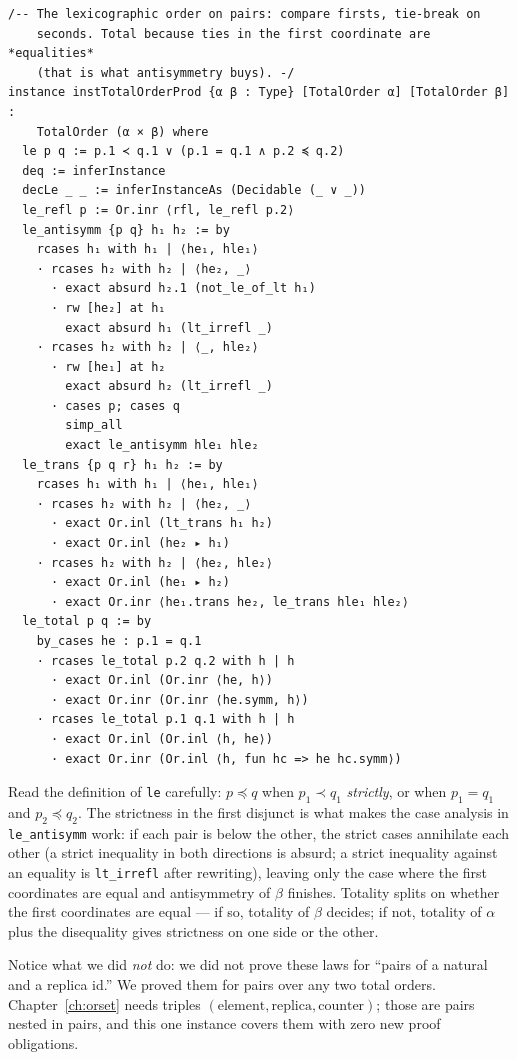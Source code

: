 \documentclass[12pt, a4paper, openright]{book}
\theoremstyle{thmstyle}
\theoremstyle{defstyle}
\newcommand{\lc}[1]{\texttt{#1}}
\begin{document}
\begin{verbatim}
/-- The lexicographic order on pairs: compare firsts, tie-break on
    seconds. Total because ties in the first coordinate are *equalities*
    (that is what antisymmetry buys). -/
instance instTotalOrderProd {α β : Type} [TotalOrder α] [TotalOrder β] :
    TotalOrder (α × β) where
  le p q := p.1 ≺ q.1 ∨ (p.1 = q.1 ∧ p.2 ≼ q.2)
  deq := inferInstance
  decLe _ _ := inferInstanceAs (Decidable (_ ∨ _))
  le_refl p := Or.inr ⟨rfl, le_refl p.2⟩
  le_antisymm {p q} h₁ h₂ := by
    rcases h₁ with h₁ | ⟨he₁, hle₁⟩
    · rcases h₂ with h₂ | ⟨he₂, _⟩
      · exact absurd h₂.1 (not_le_of_lt h₁)
      · rw [he₂] at h₁
        exact absurd h₁ (lt_irrefl _)
    · rcases h₂ with h₂ | ⟨_, hle₂⟩
      · rw [he₁] at h₂
        exact absurd h₂ (lt_irrefl _)
      · cases p; cases q
        simp_all
        exact le_antisymm hle₁ hle₂
  le_trans {p q r} h₁ h₂ := by
    rcases h₁ with h₁ | ⟨he₁, hle₁⟩
    · rcases h₂ with h₂ | ⟨he₂, _⟩
      · exact Or.inl (lt_trans h₁ h₂)
      · exact Or.inl (he₂ ▸ h₁)
    · rcases h₂ with h₂ | ⟨he₂, hle₂⟩
      · exact Or.inl (he₁ ▸ h₂)
      · exact Or.inr ⟨he₁.trans he₂, le_trans hle₁ hle₂⟩
  le_total p q := by
    by_cases he : p.1 = q.1
    · rcases le_total p.2 q.2 with h | h
      · exact Or.inl (Or.inr ⟨he, h⟩)
      · exact Or.inr (Or.inr ⟨he.symm, h⟩)
    · rcases le_total p.1 q.1 with h | h
      · exact Or.inl (Or.inl ⟨h, he⟩)
      · exact Or.inr (Or.inl ⟨h, fun hc => he hc.symm⟩)
\end{verbatim}

Read the definition of \lc{le} carefully: $p \preccurlyeq q$ when
$p_1 \prec q_1$ \emph{strictly}, or when $p_1 = q_1$ and
$p_2 \preccurlyeq q_2$. The strictness in the first disjunct is what
makes the case analysis in \lc{le_antisymm} work: if each pair is below
the other, the strict cases annihilate each other (a strict inequality
in both directions is absurd; a strict inequality against an equality is
\lc{lt_irrefl} after rewriting), leaving only the case where the first
coordinates are equal and antisymmetry of $\beta$ finishes. Totality
splits on whether the first coordinates are equal --- if so, totality of
$\beta$ decides; if not, totality of $\alpha$ plus the disequality gives
strictness on one side or the other.

Notice what we did \emph{not} do: we did not prove these laws for
``pairs of a natural and a replica id.'' We proved them for pairs over
any two total orders. Chapter~\ref{ch:orset} needs triples
$(\text{element}, \text{replica}, \text{counter})$; those are pairs
nested in pairs, and this one instance covers them with zero new proof
obligations.
\end{document}
